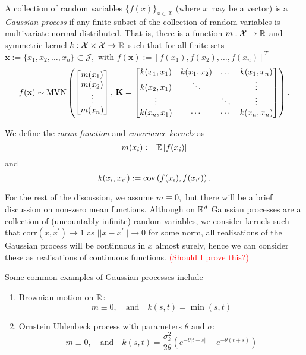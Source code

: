 \begin{definition}\label{def:gp}
    A collection of random variables $\{f(x)\}_{x\in\mathcal{X}}$
    (where $x$ may be a vector) is a \emph{Gaussian process} if any finite
    subset of the collection of random variables is multivariate normal
    distributed. That is, there is a function $m:\mathcal{X}\to\mathbb{R}$ and
    symmetric kernel $k:\mathcal{X}\times\mathcal{X}\to \mathbb{R}$ such that for all
    finite sets
    $\mathbf{x} :=\{x_1, x_2, \dots, x_n\} \subset \mathcal{J},$ with
    $f(\mathbf{x}) := [f(x_1), f(x_2), \dots, f(x_n)]^T$
    $$f(\mathbf{x}) \sim
        \operatorname{MVN}\left(\begin{bmatrix}
            m(x_1) \\ m(x_2)\\ \vdots\\ m(x_n)
        \end{bmatrix},\, \mathbf{K} = \begin{bmatrix}
            k(x_1, x_1) & k(x_1, x_2) & \dots  & k(x_1, x_n) \\
            k(x_2, x_1) & \ddots      &        & \vdots      \\
            \vdots      &             & \ddots & \vdots      \\
            k(x_n, x_1) & \cdots      & \cdots & k(x_n, x_n)
        \end{bmatrix}\right).$$
\end{definition}

\begin{definition}\label{def:mean_kernel}
    We define the \emph{mean function} and \emph{covariance kernels} as
    $$m(x_i) := \operatorname{\mathbb{E}}\left[f(x_i)\right]$$ and
    $$k(x_{i}, x_{i^\prime}) := \operatorname{cov}\left(f(x_i), f(x_{i^\prime})\right).$$
\end{definition}

For the rest of the discussion, we assume $m \equiv 0,$ but there will be a
brief discussion on non-zero mean functions. Although on $\mathbb{R}^d$ Gaussian
processes are a collection of (uncountably infinite)
random variables, we consider kernels such that
$\mathrm{corr}(x, x^\prime) \to 1$ as $||x - x^\prime||\to 0$ for some norm,
all realisations of the Gaussian process will be continuous in $x$ almost
surely, hence we can consider these as realisations of continuous functions.
\textcolor{red}{(Should I prove this?)}

Some common examples of Gaussian processes include \begin{enumerate}
    \item Brownian motion on $\mathbb{R}$:
          $$m\equiv 0, \quad \text{and}\quad k(s, t) = \min(s, t)$$
    \item Ornstein Uhlenbeck process with parameters $\theta$ and $\sigma$:
          $$
              m\equiv 0, \quad \text{and}
              \quad k(s, t)
              = \frac{\sigma^2_k}{2\theta} \left(
              e^{-\theta|t - s|} - e^{-\theta(t + s)}
              \right)
          $$
\end{enumerate}

